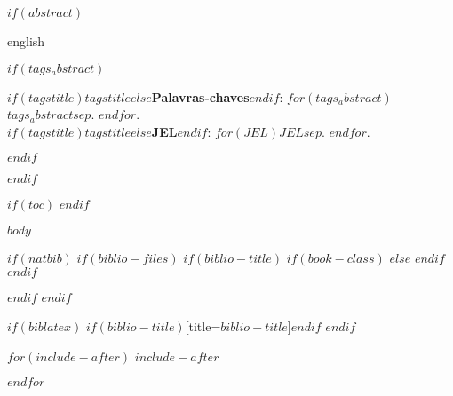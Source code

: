 \documentclass[$if(fontsize)$$fontsize$,$endif$$if(lang)$$lang$,$endif$$if(papersize)$$papersize$,$endif$$for(classoption)$$classoption$$sep$,$endfor$]{$documentclass$}	%
\begin{document}
$if(abstract)$
\setlength{\absparsep}{18pt} %
\begin{resumoumacoluna}[Abstract]
	\begin{otherlanguage*}{english}
		
	
	$if(tags_abstract)$
	\vspace{\onelineskip}
	
	\noindent
	\textbf{$if(tagstitle)$$tagstitle$$else$Palavras-chaves$endif$}: $for(tags_abstract)$$tags_abstract$$sep$. $endfor$. \\	%
	\textbf{$if(tagstitle)$$tagstitle$$else$JEL$endif$}: $for(JEL)$$JEL$$sep$. $endfor$.	%
	
	
	\end{otherlanguage*}
	$endif$
	
	
\end{resumoumacoluna}
$endif$





$if(toc)$
\tableofcontents*
\cleardoublepage
$endif$



\textual	%
$body$	%

$if(natbib)$
$if(biblio-files)$
$if(biblio-title)$
$if(book-class)$
\renewcommand\bibname{$biblio-title$}
$else$
\renewcommand\refname{$biblio-title$}
$endif$
$endif$


$endif$
$endif$


$if(biblatex)$
\printbibliography$if(biblio-title)$[title=$biblio-title$]$endif$
$endif$

$for(include-after)$
$include-after$


$endfor$
\end{document}
